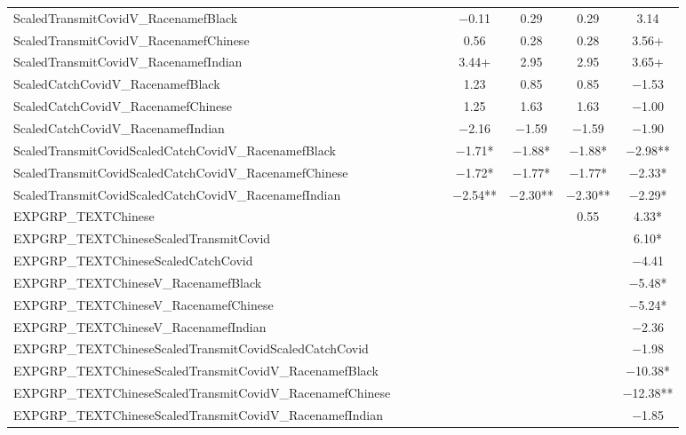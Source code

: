 \documentclass[]{report}
\begin{document}
\begin{table}
{\begin{tabular}[t]{lcccccccc}
		ScaledTransmitCovidV\_RacenamefBlack &  &  &  &  & \num{-0.11} & \num{0.29} & \num{0.29} & \num{3.14}\\
		ScaledTransmitCovidV\_RacenamefChinese &  &  &  &  & \num{0.56} & \num{0.28} & \num{0.28} & \num{3.56}+\\
		ScaledTransmitCovidV\_RacenamefIndian &  &  &  &  & \num{3.44}+ & \num{2.95} & \num{2.95} & \num{3.65}+\\
		ScaledCatchCovidV\_RacenamefBlack &  &  &  &  & \num{1.23} & \num{0.85} & \num{0.85} & \num{-1.53}\\
		ScaledCatchCovidV\_RacenamefChinese &  &  &  &  & \num{1.25} & \num{1.63} & \num{1.63} & \num{-1.00}\\
		ScaledCatchCovidV\_RacenamefIndian &  &  &  &  & \num{-2.16} & \num{-1.59} & \num{-1.59} & \num{-1.90}\\
		ScaledTransmitCovidScaledCatchCovidV\_RacenamefBlack &  &  &  &  & \num{-1.71}* & \num{-1.88}* & \num{-1.88}* & \num{-2.98}**\\
		ScaledTransmitCovidScaledCatchCovidV\_RacenamefChinese &  &  &  &  & \num{-1.72}* & \num{-1.77}* & \num{-1.77}* & \num{-2.33}*\\
		ScaledTransmitCovidScaledCatchCovidV\_RacenamefIndian &  &  &  &  & \num{-2.54}** & \num{-2.30}** & \num{-2.30}** & \num{-2.29}*\\
		EXPGRP\_TEXTChinese &  &  &  &  &  &  & \num{0.55} & \num{4.33}*\\
		EXPGRP\_TEXTChineseScaledTransmitCovid &  &  &  &  &  &  &  & \num{6.10}*\\
		EXPGRP\_TEXTChineseScaledCatchCovid &  &  &  &  &  &  &  & \num{-4.41}\\
		EXPGRP\_TEXTChineseV\_RacenamefBlack &  &  &  &  &  &  &  & \num{-5.48}*\\
		EXPGRP\_TEXTChineseV\_RacenamefChinese &  &  &  &  &  &  &  & \num{-5.24}*\\
		EXPGRP\_TEXTChineseV\_RacenamefIndian &  &  &  &  &  &  &  & \num{-2.36}\\
		EXPGRP\_TEXTChineseScaledTransmitCovidScaledCatchCovid &  &  &  &  &  &  &  & \num{-1.98}\\
		EXPGRP\_TEXTChineseScaledTransmitCovidV\_RacenamefBlack &  &  &  &  &  &  &  & \num{-10.38}*\\
		EXPGRP\_TEXTChineseScaledTransmitCovidV\_RacenamefChinese &  &  &  &  &  &  &  & \num{-12.38}**\\
		EXPGRP\_TEXTChineseScaledTransmitCovidV\_RacenamefIndian &  &  &  &  &  &  &  & \num{-1.85}\\

\end{tabular}}
\end{table}
\end{document}

